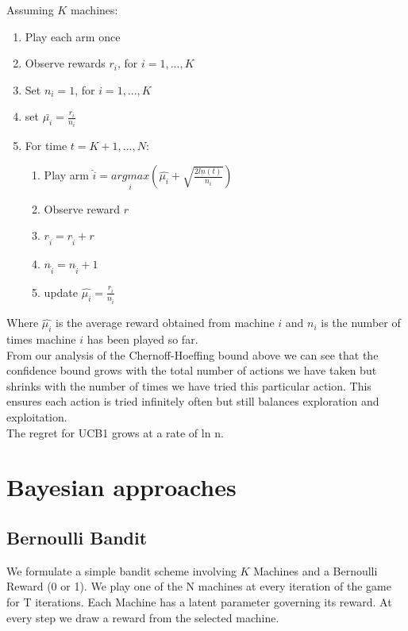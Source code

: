 \documentclass{article}
\begin{document}
Assuming $K$ machines:

\begin{enumerate}
\item Play each arm once
\item Observe rewards $r_i$, for $i = 1, ..., K$
\item Set $n_i = 1$, for $i = 1, ..., K$
\item set $\bar{\mu_{i}} = \frac{r_i}{n_i}$
\item For time $t = K+1, ..., N$:
	\begin{enumerate}
		\item Play arm $\hat{i} = \underset{i}{argmax}(\hat{\mu_{i}} + \sqrt{\frac{2 ln (t)}{n_i}})$
		\item Observe reward $r$
		\item $r_{\hat{i}} = r_{\hat{i}} + r$
		\item $n_{\hat{i}} = n_{\hat{i}} + 1$
		\item update $\hat{\mu_{i}} = \frac{r_{\hat{i}}}{n_{\hat{i}}}$
	\end{enumerate}
\end{enumerate}

Where $\hat{\mu_{i}}$ is the average reward obtained from machine $i$ and $n_i$ is the number of times machine $i$ has been played so far.\\

From our analysis of the Chernoff-Hoeffing bound above we can see that the confidence bound grows with the total number of actions we have taken but shrinks with the number of times we have tried this particular action. This ensures each action is tried infinitely often but still balances exploration and exploitation.\\

The regret for UCB1 grows at a rate of ln n.\\

\section{Bayesian approaches}

\subsection{Bernoulli Bandit}

We formulate a simple bandit scheme involving $K$ Machines and a Bernoulli Reward (0 or 1). We play one of the N machines at every iteration of the game for T iterations. Each Machine has a latent parameter governing its reward. At every step we draw a reward from the selected machine.\\
\end{document}
